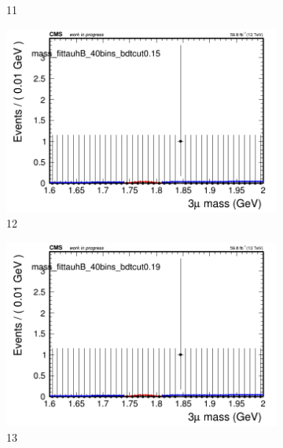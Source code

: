 \begin{figure}[h!]
\begin{subfigure}{0.2\textwidth}
        \caption{11}
    \end{subfigure}
    \begin{subfigure}{0.2\textwidth}
        \includegraphics[width=\textwidth]{unfixed_exp/plots/tauhB/massfit_tauhB_40bins_bdtcut0.15.png}
        \caption{12}
    \end{subfigure}
    \begin{subfigure}{0.2\textwidth}
        \includegraphics[width=\textwidth]{unfixed_exp/plots/tauhB/massfit_tauhB_40bins_bdtcut0.19.png}
        \caption{13}
    \end{subfigure}
    \begin{subfigure}{0.2\textwidth}

\end{subfigure}
\end{figure}
